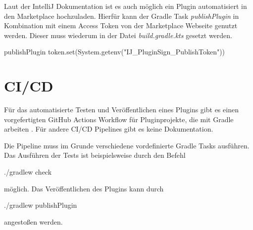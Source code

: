 Laut der IntelliJ Dokumentation ist es auch möglich ein
Plugin automatisiert in den Marketplace hochzuladen. Hierfür
kann der Gradle Task \emph{publishPlugin} in Kombination
mit einem Access Token von der Marketplace Webseite genutzt werden.
Dieser muss wiederum in der Datei \emph{build.gradle.kts} gesetzt werden.
\begin{JsCode}[numbers=none]
    publishPlugin {
        token.set(System.getenv("IJ_PluginSign_PublishToken"))
    }
\end{JsCode}

\section{CI/CD}
\label{sec:EntwicklungIntelliJ_CICD}

Für das automatisierte Testen und Veröffentlichen eines Plugins
gibt es einen vorgefertigten GitHub Actions Workflow für 
Pluginprojekte, die mit Gradle arbeiten \cite{IntelliJGitHubBuildWorkflow}.
Für andere CI/CD Pipelines gibt es keine Dokumentation.

Die Pipeline muss im Grunde verschiedene vordefinierte Gradle Tasks
ausführen. Das Ausführen der Tests ist beispielsweise durch den Befehl
\begin{GenericCode}[numbers=none]
    ./gradlew check
\end{GenericCode}
möglich. Das Veröffentlichen des Plugins kann durch
\begin{GenericCode}[numbers=none]
    ./gradlew publishPlugin 
\end{GenericCode}
angestoßen werden. 
